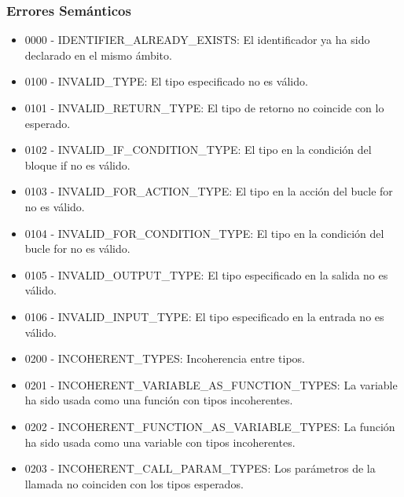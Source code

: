 \subsubsection*{Errores Semánticos}
\begin{itemize}
    \item 0000 - IDENTIFIER\_ALREADY\_EXISTS: El identificador ya ha sido declarado en el mismo ámbito.
    \item 0100 - INVALID\_TYPE: El tipo especificado no es válido.
    \item 0101 - INVALID\_RETURN\_TYPE: El tipo de retorno no coincide con lo esperado.
    \item 0102 - INVALID\_IF\_CONDITION\_TYPE: El tipo en la condición del bloque if no es válido.
    \item 0103 - INVALID\_FOR\_ACTION\_TYPE: El tipo en la acción del bucle for no es válido.
    \item 0104 - INVALID\_FOR\_CONDITION\_TYPE: El tipo en la condición del bucle for no es válido.
    \item 0105 - INVALID\_OUTPUT\_TYPE: El tipo especificado en la salida no es válido.
    \item 0106 - INVALID\_INPUT\_TYPE: El tipo especificado en la entrada no es válido.
    \item 0200 - INCOHERENT\_TYPES: Incoherencia entre tipos.
    \item 0201 - INCOHERENT\_VARIABLE\_AS\_FUNCTION\_TYPES: La variable ha sido usada como una función con tipos incoherentes.
    \item 0202 - INCOHERENT\_FUNCTION\_AS\_VARIABLE\_TYPES: La función ha sido usada como una variable con tipos incoherentes.
    \item 0203 - INCOHERENT\_CALL\_PARAM\_TYPES: Los parámetros de la llamada no coinciden con los tipos esperados.
\end{itemize}
